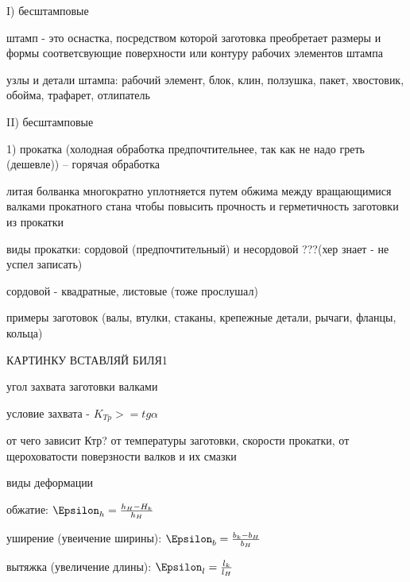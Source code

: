 {\begin{center}
    \par I) бесштамповые  

    \par штамп - это оснастка, посредством которой заготовка преобретает размеры и формы соответсвующие поверхности или контуру рабочих элементов штампа 

    \par узлы и детали штампа: рабочий элемент, блок, клин, ползушка, пакет, хвостовик, обойма, трафарет, отлипатель

    \par II) бесштамповые

    \par 1) прокатка (холодная обработка предпочтительнее, так как не надо греть (дешевле))    --  горячая обработка 

    \par литая болванка многократно уплотняется путем обжима между вращающимися валками прокатного стана чтобы повысить прочность и герметичность заготовки из прокатки

    \par виды прокатки: сордовой (предпочтительный) и несордовой ???(хер знает - не успел записать) 

    \par сордовой - квадратные, листовые (тоже прослушал)

    \par примеры заготовок (валы, втулки, стаканы, крепежные детали, рычаги, фланцы, кольца) 
    
    \par КАРТИНКУ ВСТАВЛЯЙ БИЛЯ1

    \par угол захвата заготовки валками

    \par условие захвата - $K_{Tp} >= tg \alpha$

    \par от чего зависит Ктр? от температуры заготовки, скорости прокатки, от щероховатости поверзности валков и их смазки

    \par виды деформации 

    \par обжатие: $\Epsilon_{h} = \frac{h_H - H_k}{h_H}$

    \par уширение (увеичение ширины): $\Epsilon_{b} = \frac{b_k - b_H}{b_H}$

    \par вытяжка (увеличение длины): $\Epsilon_{l} = \frac{l_k}{l_H}$


\end{center}}
